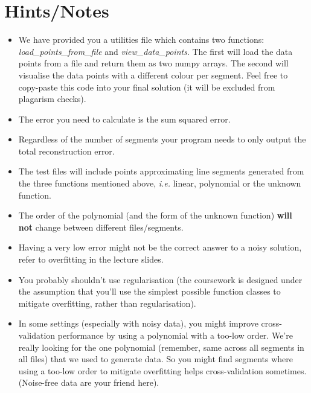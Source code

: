 \documentclass[10pt]{article}
\begin{document}
\section{Hints/Notes}
\label{sec:hints/notes}
\begin{itemize}
    \item We have provided you a utilities file which contains two functions: \textit{load\_points\_from\_file} and \textit{view\_data\_points}.
        The first will load the data points from a file and return them as two numpy arrays.
        The second will visualise the data points with a different colour per segment.
        Feel free to copy-paste this code into your final solution (it will be excluded from plagarism checks).
    \item The error you need to calculate is the sum squared error. 
    \item Regardless of the number of segments your program needs to only output the total reconstruction error. 
    \item The test files will include points approximating line segments generated from the three functions mentioned above, \textit{i.e.} linear, polynomial or the unknown function. 
    \item The order of the polynomial (and the form of the unknown function) \textbf{will not} change between different files/segments.
    \item Having a very low error might not be the correct answer to a noisy solution, refer to overfitting in the lecture slides. 
    \item You probably shouldn't use regularisation (the coursework is designed under the assumption that you'll use the simplest possible function classes to mitigate overfitting, rather than regularisation).
    \item In some settings (especially with noisy data), you might improve cross-validation performance by using a polynomial with a too-low order.  We're really looking for the one polynomial (remember, same across all segments in all files) that we used to generate data.  So you might find segments where using a too-low order to mitigate overfitting helps cross-validation sometimes.  (Noise-free data are your friend here).
\end{itemize}
\end{document}
